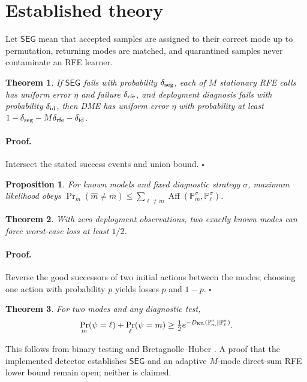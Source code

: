 \documentclass[10pt]{article}
\newtheorem{theorem}{Theorem}
\newtheorem{proposition}{Proposition}
\begin{document}
\section{Established theory}
Let $\mathsf{SEG}$ mean that accepted samples are assigned to their correct
mode up to permutation, returning modes are matched, and quarantined samples
never contaminate an RFE learner.
\begin{theorem}
If $\mathsf{SEG}$ fails with probability $\delta_{\rm seg}$, each of $M$
stationary RFE calls has uniform error $\eta$ and failure
$\delta_{\rm rfe}$, and deployment diagnosis fails with probability
$\delta_{\rm id}$, then DME has uniform error $\eta$ with probability at least
$1-\delta_{\rm seg}-M\delta_{\rm rfe}-\delta_{\rm id}$.
\end{theorem}
\paragraph{Proof.} Intersect the stated success events and union bound.
\hfill$\square$
\begin{proposition}
For known models and fixed diagnostic strategy $\sigma$, maximum likelihood
obeys $\Pr_m(\widehat m\ne m)\le\sum_{\ell\ne m}
\operatorname{Aff}(\mathbb P_m^\sigma,\mathbb P_\ell^\sigma)$.
\end{proposition}
\begin{theorem}
With zero deployment observations, two exactly known modes can force
worst-case loss at least $1/2$.
\end{theorem}
\paragraph{Proof.} Reverse the good successors of two initial actions between
the modes; choosing one action with probability $p$ yields losses $p$ and
$1-p$. \hfill$\square$
\begin{theorem}
For two modes and any diagnostic test,
\[
\Pr_m(\psi=\ell)+\Pr_\ell(\psi=m)\ge
\tfrac12e^{-D_{\rm KL}(\mathbb P_m^\sigma\Vert\mathbb P_\ell^\sigma)} .
\]
\end{theorem}
This follows from binary testing and Bretagnolle--Huber
\citep{bretagnolle1978estimation}. A proof that the implemented detector
establishes $\mathsf{SEG}$ and an adaptive $M$-mode direct-sum RFE lower bound
remain open; neither is claimed.
\end{document}
